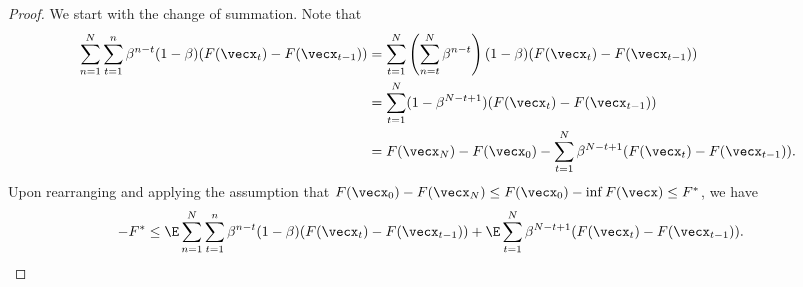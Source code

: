 \begin{proof}
We start with the change of summation. Note that
\begin{align*}
    \sum_{n=1}^N \sum_{t=1}^n \beta^{n-t}(1-\beta) (F(\vecx_t) - F(\vecx_{t-1})) 
    &= \sum_{t=1}^N \left(\sum_{n=t}^N \beta^{n-t}\right) (1-\beta) (F(\vecx_t) - F(\vecx_{t-1})) \\
    &= \sum_{t=1}^N (1-\beta^{N-t+1}) (F(\vecx_t) - F(\vecx_{t-1})) \\
    &= F(\vecx_N) - F(\vecx_0) - \sum_{t=1}^N \beta^{N-t+1}(F(\vecx_t)-F(\vecx_{t-1})).
\end{align*}
Upon rearranging and applying the assumption that $F(\vecx_0)-F(\vecx_N) \le F(\vecx_0)-\inf F(\vecx) \le F^*$, we have
\begin{align}
    -F^* &\le \E\sum_{n=1}^N\sum_{t=1}^n \beta^{n-t}(1-\beta)(F(\vecx_t)-F(\vecx_{t-1})) + \E\sum_{t=1}^N \beta^{N-t+1} (F(\vecx_t) - F(\vecx_{t-1})).
    \label{eq:exp-1}
\end{align}


\end{proof}
